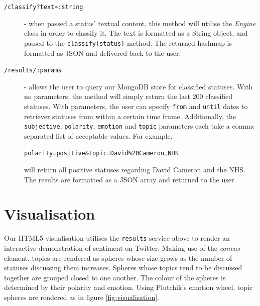 \begin{description}
	\item [\texttt{/classify?text=:string}] - when passed a status' textual content, this method will utilise the \emph{Engine} class in order to classify it. The text is formatted as a String object, and passed to the \texttt{classify(status)} method. The returned hashmap is formatted as JSON and delivered back to the user.
	\item [\texttt{/results/:params}] - allows the user to query our MongoDB store for classified statuses. With no parameters, the method will simply return the last 200 classified statuses. With parameters, the user can specify \texttt{from} and \texttt{until} dates to retriever statuses from within a certain time frame. Additionally, the \texttt{subjective}, \texttt{polarity}, \texttt{emotion} and \texttt{topic} parameters each take a comma separated list of acceptable values. For example, 
	\begin{center}
		\texttt{polarity=positive\&topic=David\%20Cameron,NHS} 
	\end{center}
will return all positive statuses regarding David Cameron and the NHS. The results are formatted as a JSON array and returned to the user.
\end{description}

\section{Visualisation}

Our HTML5 visualisation utilises the \texttt{results} service above to render an interactive demonstration of sentiment on Twitter. Making use of the \emph{canvas} element, topics are rendered as spheres whose size grows as the number of statuses discussing them increases. Spheres whose topics tend to be discussed together are grouped closed to one another. The colour of the spheres is determined by their polarity and emotion. Using Plutchik's emotion wheel, topic spheres are rendered as in figure \ref{fig:visualisation}.

